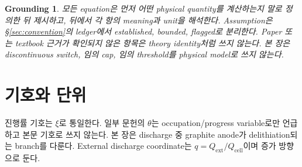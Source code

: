 \documentclass[11pt,a4paper]{article}
\newtheorem*{groundingbox}{Grounding}
\newcommand{\cell}{\mathrm{cell}}
\newcommand{\ext}{\mathrm{ext}}
\begin{document}
\begin{groundingbox}
모든 equation은 먼저 어떤 physical quantity를 계산하는지 말로 정의한 뒤 제시하고, 뒤에서 각 항의 meaning과 unit을 해석한다.
Assumption은 \S\ref{sec:convention}의 ledger에서 established, bounded, flagged로 분리한다. Paper 또는 textbook 근거가
확인되지 않은 항목은 theory identity처럼 쓰지 않는다. 본 장은 discontinuous switch, 임의 cap, 임의 threshold를 physical model로 쓰지 않는다.
\end{groundingbox}

\tableofcontents
\newpage

\section{기호와 단위}\label{sec:notation}
진행률 기호는 $\xi$로 통일한다. 일부 문헌의 $\theta$는 occupation/progress variable로만 언급하고 본문 기호로 쓰지 않는다.
본 장은 discharge 중 graphite anode가 delithiation되는 branch를 다룬다. External discharge coordinate는
$q=Q_{\ext}/Q_{\cell}$이며 증가 방향으로 둔다.
\end{document}
